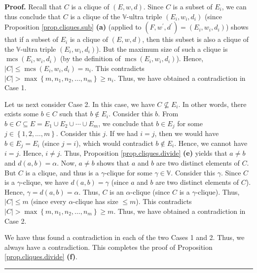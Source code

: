 \documentclass[numbers=enddot,12pt,final,onecolumn,notitlepage]{scrartcl}%
\theoremstyle{definition}
\newenvironment{proof}[1][Proof]{\noindent\textbf{#1.} }{\ \rule{0.5em}{0.5em}}
\renewcommand{\leq}{\leqslant}
\renewcommand{\geq}{\geqslant}
\theoremstyle{plainsl}
\begin{document}
\begin{proof}
Recall that $C$ is a clique of $\left(  E,w,d\right)  $. Since $C$ is a subset
of $E_{i}$, we can thus conclude that $C$ is a clique of the $\mathbb{V}%
$-ultra triple $\left(  E_{i},w_{i},d_{i}\right)  $ (since Proposition
\ref{prop.cliques.sub} \textbf{(a)} (applied to $\left(  F,w^{\prime
},d^{\prime}\right)  =\left(  E_{i},w_{i},d_{i}\right)  $) shows that if a
subset of $E_{i}$ is a clique of $\left(  E,w,d\right)  $, then this subset is
also a clique of the $\mathbb{V}$-ultra triple $\left(  E_{i},w_{i}%
,d_{i}\right)  $). But the maximum size of such a clique is
$\operatorname*{mcs}\left(  E_{i},w_{i},d_{i}\right)  $ (by the definition of
$\operatorname*{mcs}\left(  E_{i},w_{i},d_{i}\right)  $). Hence, $\left\vert
C\right\vert \leq\operatorname*{mcs}\left(  E_{i},w_{i},d_{i}\right)  =n_{i}$.
This contradicts $\left\vert C\right\vert >\max\left\{  m,n_{1},n_{2}%
,\ldots,n_{m}\right\}  \geq n_{i}$. Thus, we have obtained a contradiction in
Case 1.

Let us next consider Case 2. In this case, we have $C\not \subseteq E_{i}$. In
other words, there exists some $b\in C$ such that $b\notin E_{i}$. Consider
this $b$. From $b\in C\subseteq E=E_{1}\cup E_{2}\cup\cdots\cup E_{m}$, we
conclude that $b\in E_{j}$ for some $j\in\left\{  1,2,\ldots,m\right\}  $.
Consider this $j$. If we had $i=j$, then we would have $b\in E_{j}=E_{i}$
(since $j=i$), which would contradict $b\notin E_{i}$. Hence, we cannot have
$i=j$. Hence, $i\neq j$. Thus, Proposition \ref{prop.cliques.divide}
\textbf{(e)} yields that $a\neq b$ and $d\left(  a,b\right)  =\alpha$. Now,
$a\neq b$ shows that $a$ and $b$ are two distinct elements of $C$. But $C$ is
a clique, and thus is a $\gamma$-clique for some $\gamma\in\mathbb{V}$.
Consider this $\gamma$. Since $C$ is a $\gamma$-clique, we have $d\left(
a,b\right)  =\gamma$ (since $a$ and $b$ are two distinct elements of $C$).
Hence, $\gamma=d\left(  a,b\right)  =\alpha$. Thus, $C$ is an $\alpha$-clique
(since $C$ is a $\gamma$-clique). Thus, $\left\vert C\right\vert \leq m$
(since every $\alpha$-clique has size $\leq m$). This contradicts $\left\vert
C\right\vert >\max\left\{  m,n_{1},n_{2},\ldots,n_{m}\right\}  \geq m$. Thus,
we have obtained a contradiction in Case 2.

We have thus found a contradiction in each of the two Cases 1 and 2. Thus, we
always have a contradiction. This completes the proof of Proposition
\ref{prop.cliques.divide} \textbf{(f)}.
\end{proof}
\end{document}
